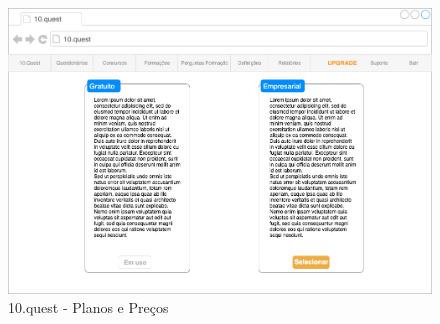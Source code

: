 \begin{figure}[ht!]
	\begin{center}
		\includegraphics[width=1\textwidth]{img/prototipos/21.png}
		\caption{10.quest - Planos e Preços}
		\label{10q-plano}
	\end{center}
\end{figure}




